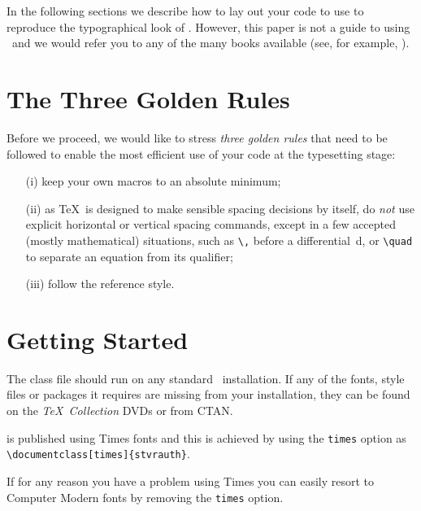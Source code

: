 \documentclass[times]{stvrauth}
\begin{document}
In the following sections we describe how to lay out your code to
use \textsf{\journalclass} to reproduce the typographical look of
\emph{\journalnamelc}. However, this paper is not a guide to
using \LaTeXe\ and we would refer you to any of the many books
available (see, for example, \cite{R1,R2,R3}).

\vspace{-6pt}

\section{The Three Golden Rules}
\vspace{-2pt}

Before we proceed, we would like to stress \emph{three golden
rules} that need to be followed to enable the most efficient use
of your code at the typesetting stage:
\begin{enumerate}
\item[(i)] keep your own macros to an absolute minimum;

\item[(ii)] as \TeX\ is designed to make sensible spacing
decisions by itself, do \emph{not} use explicit horizontal or
vertical spacing commands, except in a few accepted (mostly
mathematical) situations, such as \verb"\," before a
differential~d, or \verb"\quad" to separate an equation from its
qualifier;

\item[(iii)] follow the \emph{\journalnamelc} reference style.
\end{enumerate}

\pagebreak

\section{Getting Started} The \textsf{\journalclassshort} class file should run
on any standard \LaTeXe\ installation. If any of the fonts, style
files or packages it requires are missing from your installation,
they can be found on the \emph{\TeX\ Collection} DVDs or from
CTAN.

\emph{\journalnamelc} is published using Times fonts and this is
achieved by using the \verb"times"
option as\\
\verb"\documentclass[times]{stvrauth}".

\noindent If for any reason you have a problem using Times you can
easily resort to Computer Modern fonts by removing the
\verb"times" option.
\end{document}
